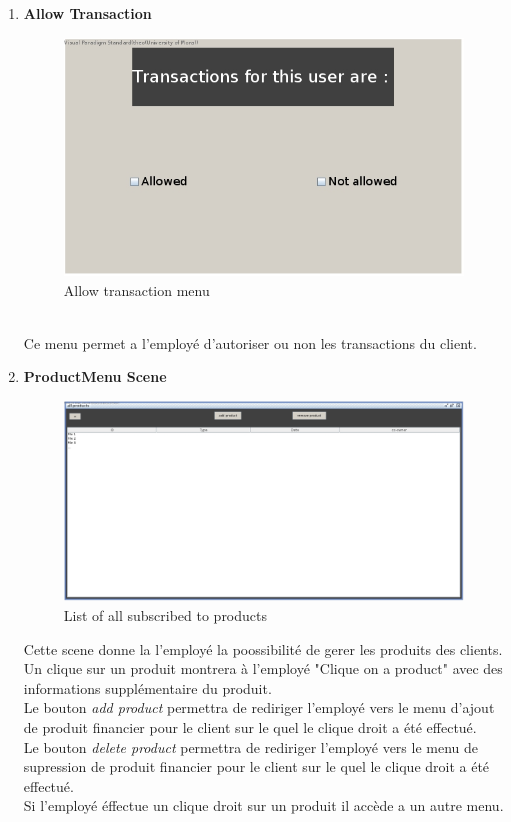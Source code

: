 \documentclass[../rapport.tex]{subfiles}
\begin{document}
\begin{enumerate}
\item \textbf{Allow Transaction} \\
		\begin{figure}[h!]
				\centering \includegraphics[scale=0.2]{ressources/photos_diagrammes/app2/gui/allowTransactions.jpg}
				\caption{Allow transaction menu}
		\end{figure}
		\\
Ce menu permet a l'employé d'autoriser ou non les transactions du client.\\

\newpage
\item \textbf{ProductMenu Scene} \\
		\begin{figure}[h!]
				\centering \includegraphics[scale=0.2]{ressources/photos_diagrammes/app2/gui/productsMenuScene.jpg}
				\caption{List of all subscribed to products}
		\end{figure}

Cette scene donne la l'employé la poossibilité de gerer les produits des clients.\\
Un clique sur un produit montrera à l'employé "Clique on a product" avec des informations supplémentaire du produit.\\
Le bouton \textit{add product} permettra de rediriger l'employé vers le menu d'ajout de produit financier pour le client sur le quel le clique droit a été effectué.\\
Le bouton \textit{delete product} permettra de rediriger l'employé vers le menu de supression de produit financier pour le client sur le quel le clique droit a été effectué.\\
Si l'employé éffectue un clique droit sur un produit il accède a un autre menu.\\


\end{enumerate}
\end{document}
